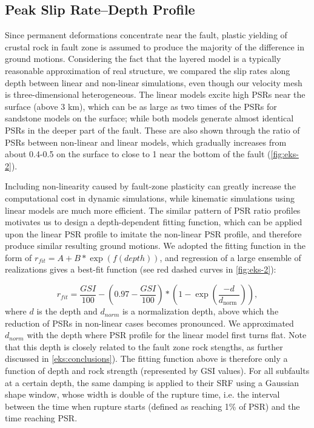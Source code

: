 \subsection{Peak Slip Rate–Depth Profile}
Since permanent deformations concentrate near the fault, plastic yielding of crustal rock in fault zone is assumed to produce the majority of the difference in ground motions. Considering the fact that the layered model is a typically reasonable approximation of real structure, we compared the slip rates along depth between linear and non-linear simulations, even though our velocity mesh is three-dimensional heterogeneous. The linear models excite high PSRs near the surface (above 3 km), which can be as large as two times of the PSRs for sandstone models on the surface; while both models generate almost identical PSRs in the deeper part of the fault. These are also shown through the ratio of PSRs between non-linear and linear models, which gradually increases from about 0.4-0.5 on the surface to close to 1 near the bottom of the fault (\cref{fig:eks-2}).

Including non-linearity caused by fault-zone plasticity can greatly increase the computational cost in dynamic simulations, while kinematic simulations using linear models are much more efficient. The similar pattern of PSR ratio profiles motivates us to design a depth-dependent fitting function, which can be applied upon the linear PSR profile to imitate the non-linear PSR profile, and therefore produce similar resulting ground motions. We adopted the fitting function in the form of $r_{fit}=A+B * \exp \left(f(depth)\right)$, and regression of a large ensemble of realizations gives a best-fit function (see red dashed curves in \cref{fig:eks-2}):

\begin{equation}\label{eq:eks-2}
    r_{f i t}=\frac{G S I}{100} - \left(0.97-\frac{G S I}{100}\right) * (1 - \exp \left(\frac{-d}{d_{\text {norm }}}\right)),
\end{equation}
where $d$ is the depth and $d_{norm}$ is a normalization depth, above which the reduction of PSRs in non-linear cases becomes pronounced. We approximated $d_{norm}$ with the depth where PSR profile for the linear model first turns flat. Note that this depth is closely related to the fault zone rock stengths, as further discussed in \cref{eks:conclusions}). The fitting function above is therefore only a function of depth and rock strength (represented by GSI values). For all subfaults at a certain depth, the same damping is applied to their SRF using a Gaussian shape window, whose width is double of the rupture time, i.e. the interval between the time when rupture starts (defined as reaching 1\% of PSR) and the time reaching PSR.

